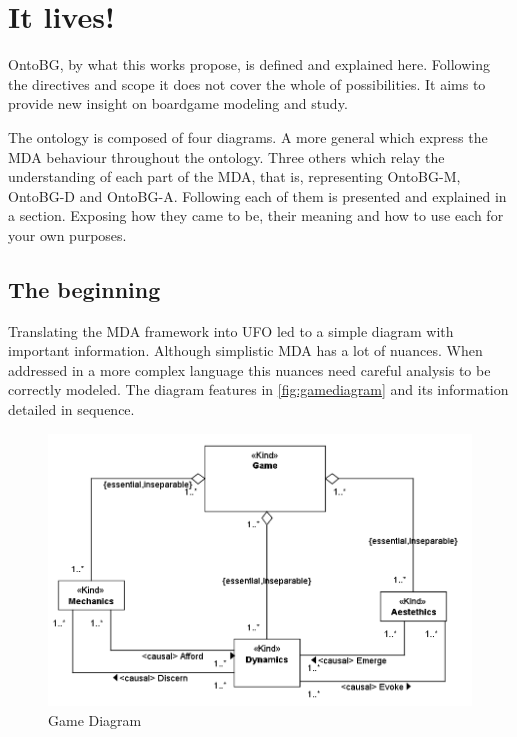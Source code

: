 \section{It lives!}

OntoBG, by what this works propose, is defined and explained here. Following the directives and scope it does not cover the whole of possibilities. It aims to provide new insight on boardgame modeling and study. 

The ontology is composed of four diagrams. A more general which express the MDA behaviour throughout the ontology. Three others which relay the understanding of each part of the MDA, that is, representing OntoBG-M, OntoBG-D and OntoBG-A. Following each of them is presented and explained in a section. Exposing how they came to be, their meaning and how to use each for your own purposes.  

\subsection{The beginning}

Translating the MDA framework into UFO led to a simple diagram with important information. Although simplistic MDA has a lot of nuances. When addressed in a more complex language this nuances need careful analysis to be correctly modeled. The diagram features in \autoref{fig:gamediagram} and its information detailed in sequence.

\begin{figure}[!h]
    \centering
    \includegraphics[scale=0.65]{Images/Model/Game.png}
    \caption{Game Diagram}
    \label{fig:gamediagram}
\end{figure}


